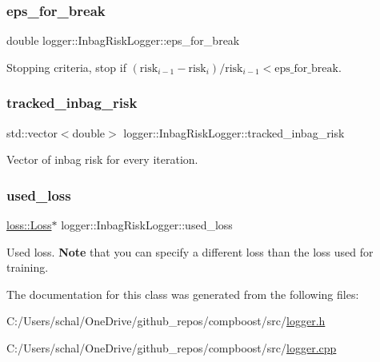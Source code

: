 \subsubsection{\texorpdfstring{eps\+\_\+for\+\_\+break}{eps\_for\_break}}
{\footnotesize\ttfamily double logger\+::\+Inbag\+Risk\+Logger\+::eps\+\_\+for\+\_\+break\hspace{0.3cm}{\ttfamily [private]}}



Stopping criteria, stop if $(\mathrm{risk}_{i-1} - \mathrm{risk}_i) / \mathrm{risk}_{i-1} < \mathrm{eps\_for\_break}$. 

\mbox{\label{classlogger_1_1_inbag_risk_logger_aed427deee828fd480e5fa9536360b16b}} 
\subsubsection{\texorpdfstring{tracked\+\_\+inbag\+\_\+risk}{tracked\_inbag\_risk}}
{\footnotesize\ttfamily std\+::vector$<$double$>$ logger\+::\+Inbag\+Risk\+Logger\+::tracked\+\_\+inbag\+\_\+risk\hspace{0.3cm}{\ttfamily [private]}}



Vector of inbag risk for every iteration. 

\mbox{\label{classlogger_1_1_inbag_risk_logger_afee746bf4009661f930ea8294e7f72fc}} 
\subsubsection{\texorpdfstring{used\+\_\+loss}{used\_loss}}
{\footnotesize\ttfamily \mbox{\hyperlink{classloss_1_1_loss}{loss\+::\+Loss}}$\ast$ logger\+::\+Inbag\+Risk\+Logger\+::used\+\_\+loss\hspace{0.3cm}{\ttfamily [private]}}



Used loss. {\bfseries Note} that you can specify a different loss than the loss used for training. 



The documentation for this class was generated from the following files\+:\begin{DoxyCompactItemize}
\item 
C\+:/\+Users/schal/\+One\+Drive/github\+\_\+repos/compboost/src/\mbox{\hyperlink{logger_8h}{logger.\+h}}\item 
C\+:/\+Users/schal/\+One\+Drive/github\+\_\+repos/compboost/src/\mbox{\hyperlink{logger_8cpp}{logger.\+cpp}}\end{DoxyCompactItemize}

